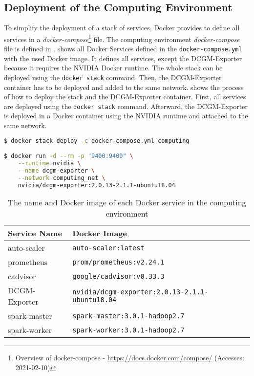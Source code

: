 \subsection{Deployment of the Computing Environment}
\label{subsec:06_env_depl} 
To simplify the deployment of a stack of services, Docker provides to define all services in a \textit{docker-compose}\footnote{Overview of docker-compose - \url{https://docs.docker.com/compose/} (Accesses: 2021-02-10)} file.
The computing environment \textit{docker-compose} file is defined in .
%
 shows all Docker Services defined in the \texttt{docker-compose.yml} with the used Docker image.
%
It defines all services, except the DCGM-Exporter because it requires the NVIDIA Docker runtime.
%
The whole stack can be deployed using the \texttt{docker stack} command. Then, the DCGM-Exporter container has to be deployed and added to the same network.
%
 shows the process of how to deploy the stack and the DCGM-Exporter container. First, all services are deployed using the \texttt{docker stack} command. Afterward, the DCGM-Exporter is deployed in a Docker container using the NVIDIA runtime and attached to the same network.
\begin{lstlisting}[label=lst:06_env_depl_docker-stack, caption=Commands to deploy the computing environment, language=sh, numbers=none]
$ docker stack deploy -c docker-compose.yml computing

$ docker run -d --rm -p "9400:9400" \
    --runtime=nvidia \
    --name dcgm-exporter \
    --network computing_net \
    nvidia/dcgm-exporter:2.0.13-2.1.1-ubuntu18.04
\end{lstlisting}
\begin{table}[]
\centering
\begin{tabular}{@{}ll@{}}
\toprule
Service Name  & Docker Image                                  \\ \midrule
auto-scaler   & \texttt{auto-scaler:latest}                            \\
prometheus    & \texttt{prom/prometheus:v2.24.1}                       \\
cadvisor      & \texttt{google/cadvisor:v0.33.3}                       \\
DCGM-Exporter & \texttt{nvidia/dcgm-exporter:2.0.13-2.1.1-ubuntu18.04} \\
spark-master  & \texttt{spark-master:3.0.1-hadoop2.7}                  \\
spark-worker  & \texttt{spark-worker:3.0.1-hadoop2.7}                  \\ \bottomrule
\end{tabular}
\caption{The name and Docker image of each Docker service in the computing environment}
\label{table:06_env_depl_docker-stack}
\end{table}



